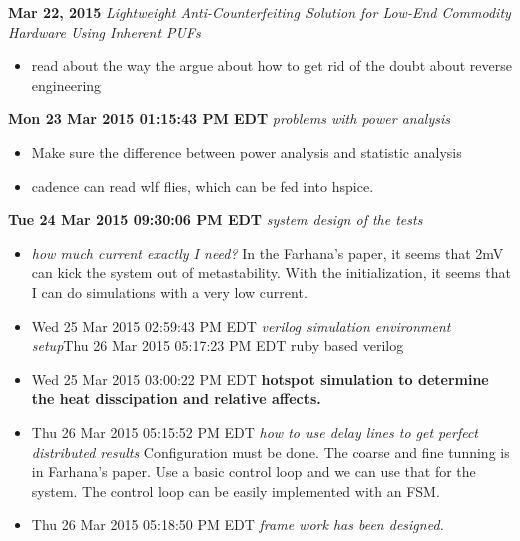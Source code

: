 \documentclass[]{article}
\newcommand{\todo}[1]{{\color{red}\textbf{#1}}}
\newcommand{\solved}[1]{{\color{blue}\textit{#1}}}
\begin{document}
\noindent \textbf{Mar 22, 2015}
\textit{Lightweight Anti-Counterfeiting Solution for Low-End Commodity Hardware
Using Inherent PUFs}
\indent     \begin{itemize}
            \item read about the way the argue about how to get rid of the doubt
            about reverse engineering
            \end{itemize}

\noindent \textbf{Mon 23 Mar 2015 01:15:43 PM EDT}
\textit{problems with power analysis}
\indent		\begin{itemize}
                \item Make sure the difference between power analysis and statistic
                analysis
                \item cadence can read wlf flies, which can be fed into hspice.
            \end{itemize}

\noindent \textbf{Tue 24 Mar 2015 09:30:06 PM EDT}
\textit{system design of the tests}
\indent		\begin{itemize}
            \item \solved{how much current exactly I need?} In the Farhana's
            paper, it seems that 2mV can kick the system out of metastability.
            With the initialization, it seems that I can do simulations with a
            very low current.
            \item Wed 25 Mar 2015 02:59:43 PM EDT \solved{verilog simulation
            environment setup}Thu 26 Mar 2015 05:17:23 PM EDT ruby based verilog
            \item Wed 25 Mar 2015 03:00:22 PM EDT \todo{hotspot simulation to
            determine the heat disscipation and relative affects.}
            \item Thu 26 Mar 2015 05:15:52 PM EDT \solved{how to use delay lines
            to get perfect distributed results} Configuration must be done. The
            coarse and fine tunning is in Farhana's paper. Use a basic control
            loop and we can use that for the system. The control loop can be
            easily implemented with an FSM.
            \item Thu 26 Mar 2015 05:18:50 PM EDT \solved{frame work has been
            designed.}
            \end{itemize}
\end{document}
